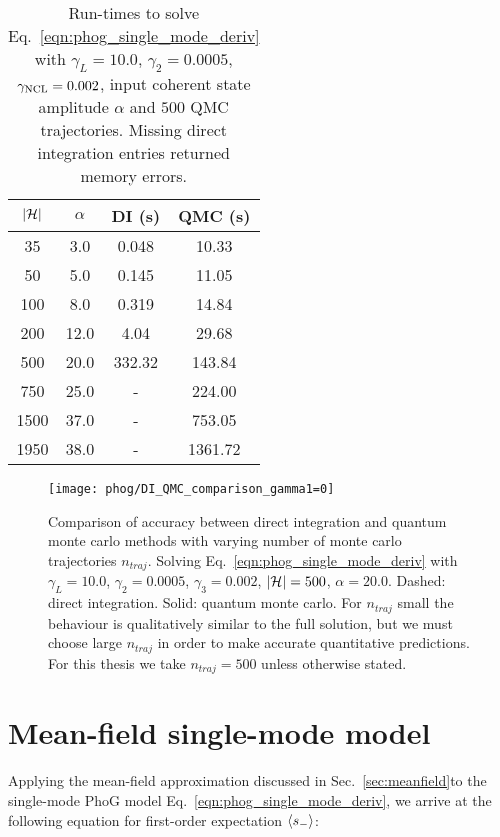 \begin{table}[htp]
\captionsetup{width=0.8\linewidth}
\begin{tabular}{|c|c|c|c|}
\hline 
$\left|\mathcal{H}\right|$ & $\alpha$ & DI (s) & QMC (s) \\ 
\hline
\hline 
35 & 3.0 & 0.048 & 10.33 \\ 
\hline 
50 & 5.0 & 0.145 & 11.05 \\ 
\hline 
100 & 8.0 & 0.319 & 14.84 \\ 
\hline 
200 & 12.0 & 4.04 & 29.68 \\ 
\hline 
500 & 20.0 & 332.32 & 143.84 \\ 
\hline 
750 & 25.0 & - & 224.00 \\ 
\hline 
1500 & 37.0 & - & 753.05 \\ 
\hline 
1950 & 38.0 & - & 1361.72 \\ 
\hline 
\end{tabular} 
\caption{\label{table:numerical_methods} Run-times to solve Eq.~\ref{eqn:phog_single_mode_deriv} with $\gamma_L = 10.0$, $\gamma_2 = 0.0005$, $\gamma_{\text{NCL}} = 0.002$, input coherent state amplitude $\alpha$ and $500$ QMC trajectories. Missing direct integration entries returned memory errors.}
\end{table}


\begin{figure}[htp]
\captionsetup{width=0.8\linewidth}
\centering
\texttt{[image: phog/DI\_QMC\_comparison\_gamma1=0]}
\caption{\label{fig:appendix_numerical_methods_comparisons} Comparison of accuracy between direct integration and quantum monte carlo methods with varying number of monte carlo trajectories $n_{traj}$. Solving Eq.~\ref{eqn:phog_single_mode_deriv} with $\gamma_L = 10.0$, $\gamma_2 = 0.0005$, $\gamma_3 = 0.002$, $\left|\mathcal{H}\right| = 500$, $\alpha = 20.0$. Dashed: direct integration. Solid: quantum monte carlo. For $n_{traj}$ small the behaviour is qualitatively similar to the full solution, but we must choose large $n_{traj}$ in order to make accurate quantitative predictions. For this thesis we take $n_{traj}=500$ unless otherwise stated.}
\end{figure}

\clearpage
\section{Mean-field single-mode model}\label{appendix:single_mode_mean_field}
Applying the mean-field approximation discussed in Sec.~\ref{sec:meanfield}to the single-mode PhoG model Eq.~\ref{eqn:phog_single_mode_deriv}, we arrive at the following equation for first-order expectation $\ev{s_-}$:


